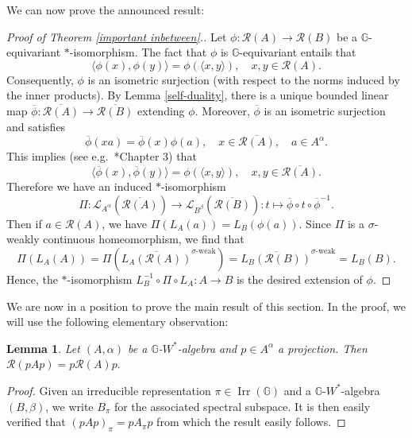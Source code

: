 \documentclass[reqno]{amsart}
\numberwithin{equation}{section}
\newtheorem{Lem}[Theorem]{Lemma}
\DeclareMathOperator{\Irr}{\mathrm{Irr}}
\newcommand{\G}{\mathbb{G}}
\begin{document}
We can now prove the announced result:

\begin{proof}[Proof of Theorem \ref{important inbetween}.]  Let $\phi: \mathcal{R}(A)\to \mathcal{R}(B)$ be a $\G$-equivariant $*$-isomorphism. The fact that $\phi$ is $\G$-equivariant entails that
    $$\langle \phi(x), \phi(y)\rangle = \phi(\langle x,y\rangle), \quad x,y \in \mathcal{R}(A).$$ 
    Consequently, $\phi$ is an isometric surjection (with respect to the norms induced by the inner products). By Lemma \ref{self-duality}, there is a unique bounded linear map
    $\overline{\phi}: \overline{\mathcal{R}(A)}\to \overline{\mathcal{R}(B)}$ extending $\phi$. Moreover, $\overline{\phi}$ is an isometric surjection and satisfies 
    $$\overline{\phi}(xa) = \overline{\phi}(x) \phi(a), \quad x \in \overline{\mathcal{R}(A)}, \quad a \in A^\alpha.$$
    This implies (see e.g.\ \cite{La95}*{Chapter 3}) that 
    $$\langle \overline{\phi}(x), \overline{\phi}(y)\rangle = \phi(\langle x,y\rangle), \quad x,y \in \overline{\mathcal{R}(A)}.$$
    Therefore
    we have an induced $*$-isomorphism
    $$\Pi: \mathscr{L}_{A^\alpha}(\overline{\mathcal{R}(A)})\to \mathscr{L}_{B^\beta}(\overline{\mathcal{R}(B)}): t \mapsto \overline{\phi}\circ t\circ \overline{\phi}^{-1}.$$
    Then if $a\in \mathcal{R}(A)$, we have $\Pi(L_A(a))= L_B(\phi(a))$. Since $\Pi$ is a $\sigma$-weakly continuous homeomorphism, we find that 
    $$\Pi(L_A(A))= \Pi(\overline{L_A(\mathcal{R}(A))}^{\sigma\text{-weak}})= \overline{L_B(\mathcal{R}(B))}^{\sigma\text{-weak}} = L_B(B).$$
   Hence, the $*$-isomorphism
   $L_B^{-1}\circ \Pi\circ L_A: A\to B$ is the desired extension of $\phi$.
\end{proof}

We are now in a position to prove the main result of this section. In the proof, we will use the following elementary observation:

\begin{Lem}\label{cornering}
    Let $(A, \alpha)$ be a $\G$-$W^*$-algebra and $p\in A^\alpha$ a projection. Then 
    $\mathcal{R}(pAp) = p\mathcal{R}(A)p.$
\end{Lem}
\begin{proof}
    Given an irreducible representation $\pi\in \Irr(\G)$ and a $\G$-$W^*$-algebra $(B, \beta)$, we write $B_\pi$ for the associated spectral subspace. It is then easily verified that $(pAp)_\pi = pA_\pi p$ from which the result easily follows.
\end{proof}
\end{document}
